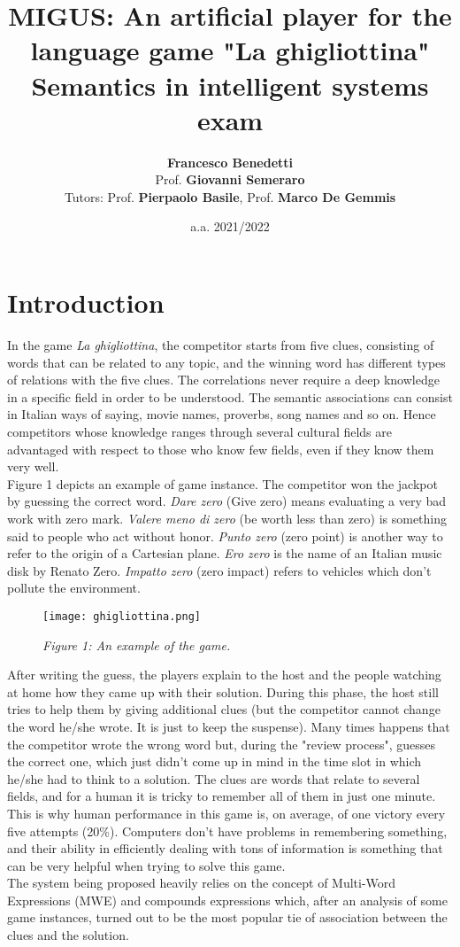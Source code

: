 \documentclass[twoside,twocolumn]{article}
\title{
\textbf {MIGUS: An artificial player for the language game "La ghigliottina"} \\
\large Semantics in intelligent systems exam
}
\author{\textbf{Francesco Benedetti} \\[1cm] 
	{Prof. \textbf{Giovanni Semeraro}} \\ 
	{\small Tutors: Prof. \textbf{Pierpaolo Basile}, Prof. \textbf{Marco De Gemmis}}
}
\date{a.a. 2021/2022}
\begin{document}
\maketitle 
\section{Introduction}
In the game \textit{La ghigliottina}, the competitor starts from five clues, consisting of words that can be related to any topic, and the winning word has different types of relations with the five clues. The correlations never require a deep knowledge in a specific field in order to be understood. The semantic associations can consist in Italian ways of saying, movie names, proverbs, song names and so on. Hence competitors whose knowledge ranges through several cultural fields are advantaged with respect to those who know few fields, even if they know them very well. \\
Figure 1 depicts an example of game instance. The competitor won the jackpot by guessing the correct word. \textit{Dare zero} (Give zero) means evaluating a very bad work with zero mark. \textit{Valere meno di zero} (be worth less than zero) is something said to people who act without honor. \textit{Punto zero} (zero point) is another way to refer to the origin of a Cartesian plane. \textit{Ero zero} is the name of an Italian music disk by Renato Zero. \textit{Impatto zero} (zero impact) refers to vehicles which don't pollute the environment.
\begin{figure}
	\texttt{[image: ghigliottina.png]}
	\caption{\emph{Figure 1: An example of the game.}}
	\label{fig:ghigliottina}
\end{figure}
After writing the guess, the players explain to the host and the people watching at home how they came up with their solution. During this phase, the host still tries to help them by giving additional clues (but the competitor cannot change the word he/she wrote. It is just to keep the suspense). Many times happens that the competitor wrote the wrong word but, during the "review process", guesses the correct one, which just didn't come up in mind in the time slot in which he/she had to think to a solution. The clues are words that relate to several fields, and for a human it is tricky to remember all of them in just one minute. This is why human performance in this game is, on average, of one victory every five attempts (20\%). Computers don't have problems in remembering something, and their ability in efficiently dealing with tons of information is something that can be very helpful when trying to solve this game. \\
The system being proposed heavily relies on the concept of Multi-Word Expressions (MWE) and compounds expressions which, after an analysis of some game instances, turned out to be the most popular tie of association between the clues and the solution.
\end{document}
